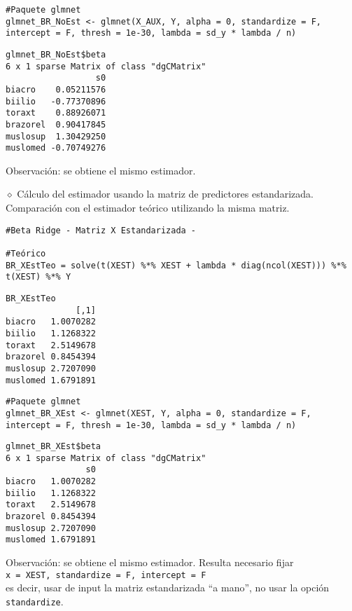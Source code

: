 \documentclass[a4paper,12pt]{report}
\begin{document}
{
\begin{verbatim}
#Paquete glmnet
glmnet_BR_NoEst <- glmnet(X_AUX, Y, alpha = 0, standardize = F, 
intercept = F, thresh = 1e-30, lambda = sd_y * lambda / n)
\end{verbatim}
}

{
\begin{verbatim}
glmnet_BR_NoEst$beta
6 x 1 sparse Matrix of class "dgCMatrix"
                  s0
biacro    0.05211576
biilio   -0.77370896
toraxt    0.88926071
brazorel  0.90417845
muslosup  1.30429250
muslomed -0.70749276
\end{verbatim}
}

Observación: se obtiene el mismo estimador.

\newpage

$\diamond$ Cálculo del estimador usando la matriz de predictores estandarizada. Comparación con el estimador teórico utilizando la misma matriz.

{
\begin{verbatim}
#Beta Ridge - Matriz X Estandarizada -

#Teórico
BR_XEstTeo = solve(t(XEST) %*% XEST + lambda * diag(ncol(XEST))) %*% 
t(XEST) %*% Y
\end{verbatim}
}

{
\begin{verbatim}
BR_XEstTeo
              [,1]
biacro   1.0070282
biilio   1.1268322
toraxt   2.5149678
brazorel 0.8454394
muslosup 2.7207090
muslomed 1.6791891
\end{verbatim}
}

{
\begin{verbatim}
#Paquete glmnet
glmnet_BR_XEst <- glmnet(XEST, Y, alpha = 0, standardize = F, 
intercept = F, thresh = 1e-30, lambda = sd_y * lambda / n)
\end{verbatim}
}

{
\begin{verbatim}
glmnet_BR_XEst$beta
6 x 1 sparse Matrix of class "dgCMatrix"
                s0
biacro   1.0070282
biilio   1.1268322
toraxt   2.5149678
brazorel 0.8454394
muslosup 2.7207090
muslomed 1.6791891
\end{verbatim}
}

Observación: se obtiene el mismo estimador. Resulta necesario fijar\\
\texttt{x = XEST, standardize = F, intercept = F}\\
es decir, usar de input la matriz estandarizada ``a mano'', no usar la opción \texttt{standardize}.
\end{document}
